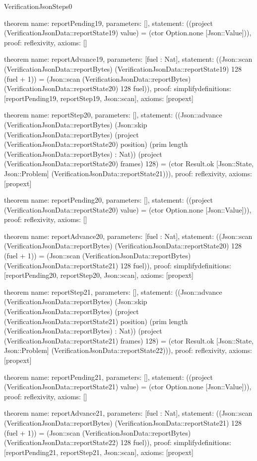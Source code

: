 \begin{lexlean}{VerificationJsonSteps0}
\begin{semanticmodule}
theorem{
  name: reportPending19,
  parameters: [],
  statement: ((project (VerificationJsonData::reportState19) value) = (ctor Option.none [Json::Value])),
  proof: reflexivity{},
  axioms: []
}

theorem{
  name: reportAdvance19,
  parameters: [fuel : Nat],
  statement: ((Json::scan (VerificationJsonData::reportBytes) (VerificationJsonData::reportState19) 128 (fuel + 1)) = (Json::scan (VerificationJsonData::reportBytes) (VerificationJsonData::reportState20) 128 fuel)),
  proof: simplify{definitions: [reportPending19, reportStep19, Json::scan]},
  axioms: [propext]
}

theorem{
  name: reportStep20,
  parameters: [],
  statement: ((Json::advance (VerificationJsonData::reportBytes) (Json::skip (VerificationJsonData::reportBytes) (project (VerificationJsonData::reportState20) position) (prim length (VerificationJsonData::reportBytes) : Nat)) (project (VerificationJsonData::reportState20) frames) 128) = (ctor Result.ok [Json::State, Json::Problem] (VerificationJsonData::reportState21))),
  proof: reflexivity{},
  axioms: [propext]
}

theorem{
  name: reportPending20,
  parameters: [],
  statement: ((project (VerificationJsonData::reportState20) value) = (ctor Option.none [Json::Value])),
  proof: reflexivity{},
  axioms: []
}

theorem{
  name: reportAdvance20,
  parameters: [fuel : Nat],
  statement: ((Json::scan (VerificationJsonData::reportBytes) (VerificationJsonData::reportState20) 128 (fuel + 1)) = (Json::scan (VerificationJsonData::reportBytes) (VerificationJsonData::reportState21) 128 fuel)),
  proof: simplify{definitions: [reportPending20, reportStep20, Json::scan]},
  axioms: [propext]
}

theorem{
  name: reportStep21,
  parameters: [],
  statement: ((Json::advance (VerificationJsonData::reportBytes) (Json::skip (VerificationJsonData::reportBytes) (project (VerificationJsonData::reportState21) position) (prim length (VerificationJsonData::reportBytes) : Nat)) (project (VerificationJsonData::reportState21) frames) 128) = (ctor Result.ok [Json::State, Json::Problem] (VerificationJsonData::reportState22))),
  proof: reflexivity{},
  axioms: [propext]
}

theorem{
  name: reportPending21,
  parameters: [],
  statement: ((project (VerificationJsonData::reportState21) value) = (ctor Option.none [Json::Value])),
  proof: reflexivity{},
  axioms: []
}

theorem{
  name: reportAdvance21,
  parameters: [fuel : Nat],
  statement: ((Json::scan (VerificationJsonData::reportBytes) (VerificationJsonData::reportState21) 128 (fuel + 1)) = (Json::scan (VerificationJsonData::reportBytes) (VerificationJsonData::reportState22) 128 fuel)),
  proof: simplify{definitions: [reportPending21, reportStep21, Json::scan]},
  axioms: [propext]
}


\end{semanticmodule}
\end{lexlean}
